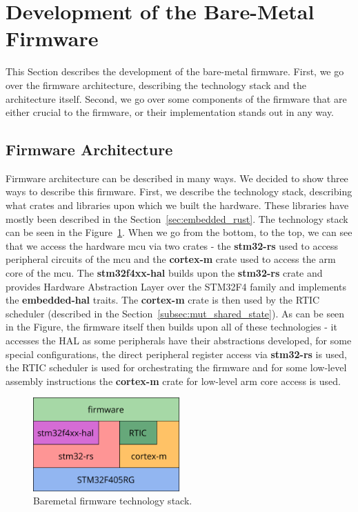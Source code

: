 \section{Development of the Bare-Metal Firmware}
\label{sec:firmware}
This Section describes the development of the bare-metal firmware.
First, we go over the firmware architecture, describing the technology stack and the architecture itself.
Second, we go over some components of the firmware that are either crucial to the firmware, or their implementation stands out in any way.

\subsection{Firmware Architecture}
\label{subsec:firmware-arch}
Firmware architecture can be described in many ways.
We decided to show three ways to describe this firmware.
First, we describe the technology stack, describing what crates and libraries upon which we built the hardware.
These libraries have mostly been described in the Section~\ref{sec:embedded_rust}.
The technology stack can be seen in the Figure~\ref{fig:firmware_tech_stack}.
When we go from the bottom, to the top, we can see that we access the hardware \acs{mcu} via two crates - the \textbf{stm32-rs} used to access peripheral circuits of the \acs{mcu} and the \textbf{cortex-m} crate used to access the \acs{arm} core of the \acs{mcu}.
The \textbf{stm32f4xx-hal} builds upon the \textbf{stm32-rs} crate and provides Hardware Abstraction Layer over the STM32F4 family and implements the \textbf{embedded-hal} traits.
The \textbf{cortex-m} crate is then used by the RTIC scheduler (described in the Section~\ref{subsec:mut_shared_state}).
As can be seen in the Figure, the firmware itself then builds upon all of these technologies - it accesses the HAL as some peripherals have their abstractions developed, for some special configurations, the direct peripheral register access via \textbf{stm32-rs} is used, the RTIC scheduler is used for orchestrating the firmware and for some low-level assembly instructions the \textbf{cortex-m} crate for low-level \acs{arm} core access is used.

\begin{figure}[H]
    \centering
    \includegraphics[width=0.5\textwidth]{obrazky/tech_stack}
    \caption{Bare\textendash metal firmware technology stack.}
    \label{fig:firmware_tech_stack}
\end{figure}

